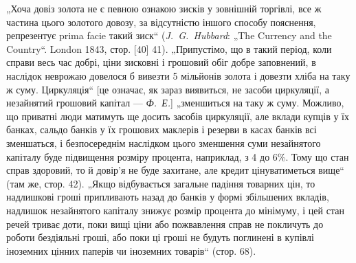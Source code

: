 „Хоча довіз золота не є певною ознакою зисків у зовнішній
торгівлі, все ж частина цього золотого довозу, за відсутністю
іншого способу пояснення, репрезентує prima facie такий зиск“
(\emph{J.~G.~Hubbard}: „The Currency and the Country“. London 1843,
стор. [40] 41). „Припустімо, що в такий період, коли справи
весь час добрі, ціни зисковні і грошовий обіг добре заповнений,
в наслідок неврожаю довелося б вивезти 5 мільйонів
золота і довезти хліба на таку ж суму. Циркуляція“ [це означає, як зараз виявиться, не засоби
циркуляції, а незайнятий грошовий капітал — \emph{Ф.~Е.}] „зменшиться на таку ж суму. Можливо, що приватні
люди матимуть ще досить засобів циркуляції,
але вклади купців у їх банках, сальдо банків у їх грошових маклерів і резерви в касах банків всі
зменшаться, і безпосереднім
наслідком цього зменшення суми незайнятого капіталу буде підвищення розміру процента, наприклад, з 4
до 6\%. Тому що стан
справ здоровий, то й довір’я не буде захитане, але кредит цінуватиметься вище“ (там же, стор. 42).
„Якщо відбувається загальне
падіння товарних цін, то надлишкові гроші припливають назад
до банків у формі збільшених вкладів, надлишок незайнятого капіталу знижує розмір процента до
мінімуму, і цей стан речей
триває доти, поки вищі ціни або пожвавлення справ не покличуть
до роботи бездіяльні гроші, або поки ці гроші не будуть поглинені в купівлі іноземних цінних паперів
чи іноземних товарів“ (стор. 68).

